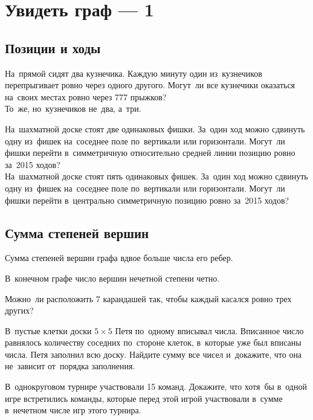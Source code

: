 
\section*{Увидеть граф --- 1}



\subsection*{Позиции и ходы}

\begin{problems}

\item
\sp
На~прямой сидят два кузнечика.
Каждую минуту один из~кузнечиков перепрыгивает ровно через одного другого.
Могут~ли все кузнечики оказаться на~своих местах ровно через 777 прыжков?
\\
\sp
То~же, но~кузнечиков не~два, а~три.

\item
\sp
На~шахматной доске стоят две одинаковых фишки.
За~один ход можно сдвинуть одну из~фишек на~соседнее поле по~вертикали или
горизонтали.
Могут~ли фишки перейти в~симметричную относительно средней линии позицию ровно
за~2015 ходов?
\\
\sp
На~шахматной доске стоят пять одинаковых фишек.
За~один ход можно сдвинуть одну из~фишек на~соседнее поле по~вертикали или
горизонтали.
Могут~ли фишки перейти в~центрально симметричную позицию ровно за~2015 ходов?

\end{problems}

\subsection*{Сумма степеней вершин}

Сумма степеней вершин графа вдвое больше числа его ребер.

В~конечном графе число вершин нечетной степени четно. 

\begin{problems}

\item
Можно~ли расположить 7 карандашей так, чтобы каждый касался ровно трех других?

\item
В~пустые клетки доски $5 \times 5$ Петя по~одному вписывал числа.
Вписанное число равнялось количеству соседних по~стороне клеток, в~которые уже
был вписаны числа.
Петя заполнил всю доску.
Найдите сумму все чисел и~докажите, что она не~зависит от~порядка заполнения.

\item
В~однокруговом турнире участвовали 15 команд.
Докажите, что хотя~бы в~одной игре встретились команды, которые перед этой
игрой участвовали в~сумме в~нечетном числе игр этого турнира.

\end{problems}

